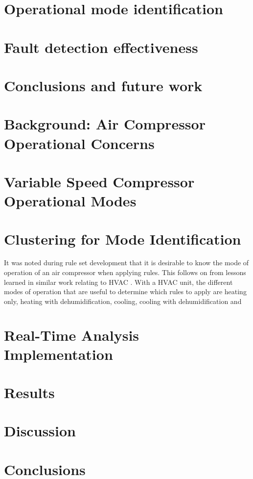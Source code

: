 \lipsum[1-10]

\section{Operational mode identification}
\label{sec:modeidentification}

\section{Fault detection effectiveness}

\section{Conclusions and future work}
\label{sec:conclusions}


\section{Background: Air Compressor Operational Concerns}
\label{sec:1}
\section{Variable Speed Compressor Operational Modes}
\label{sec:2}
\section{Clustering for Mode Identification}
\label{sec:3}
It was noted during rule set development that it is desirable to know the mode of operation of an air compressor when applying rules. This follows on from lessons learned in similar work relating to HVAC \cite{Bruton2014}. With a HVAC unit, the different modes of operation that are useful to determine which rules to apply are heating only, heating with dehumidification, cooling, cooling with dehumidification and 

\section{Real-Time Analysis Implementation}
\label{sec:4}
\section{Results}
\label{sec:5}
\section{Discussion}
\label{sec:6}
\section{Conclusions}
\label{sec:7}


